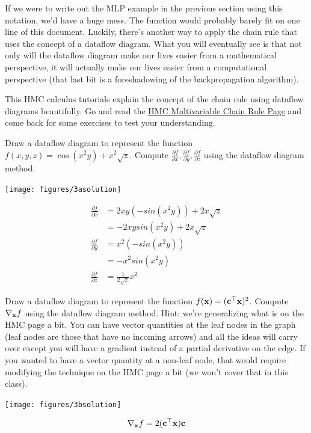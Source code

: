 \documentclass[assignment06_Solutions]{subfiles}
\begin{document}
If we were to write out the MLP example in the previous section using this notation, we'd have a huge mess.  The function would probably barely fit on one line of this document.  Luckily, there's another way to apply the chain rule that uses the concept of a dataflow diagram.  What you will eventually see is that not only will the dataflow diagram make our lives easier from a mathematical perspective, it will actually make our lives easier from a computational perspective (that last bit is a foreshadowing of the backpropagation algorithm).


\begin{externalresources}[(20 minutes)]
This HMC calculus tutorials explain the concept of the chain rule using dataflow diagrams beautifully.  Go and read the \href{https://www.math.hmc.edu/calculus/tutorials/multichainrule/}{HMC Multivariable Chain Rule Page} and come back for some exercises to test your understanding.
\end{externalresources}

\begin{exercise}[(20 minutes)]
\bes
\item Draw a dataflow diagram to represent the function $f(x,y,z) = \cos(x^2 y) + x^2 \sqrt{z}$.  Compute $\frac{\partial f}{\partial x}, \frac{\partial f}{\partial y}, \frac{\partial f}{\partial z}$ using the dataflow diagram method.
\begin{boxedsolution}
\begin{center}
\texttt{[image: figures/3asolution]}
\end{center}
\begin{align}
\frac{\partial f}{\partial x}&= 2x y (-sin(x^2 y)) + 2x{\sqrt z} \nonumber \\
&= -2x y sin(x^2 y) + 2x{\sqrt z} \\
\frac{\partial f}{\partial y} &= x^2 (-sin(x^2 y)) \nonumber \\
&= -x^2 sin(x^2 y) \\
\frac{\partial f}{\partial z} &= \frac{1}{2 \sqrt z} x^2
\end{align}
\end{boxedsolution}
\item Draw a dataflow diagram to represent the function $f(\mathbf{x}) = (\mathbf{c}^\top \mathbf{x})^2$.  Compute $\nabla_{\mathbf{x}} f$ using the dataflow diagram method.  Hint: we're generalizing what is on the HMC page a bit.  You can have vector quantities at the leaf nodes in the graph (leaf nodes are those that have no incoming arrows) and all the ideas will carry over except you will have a gradient instead of a partial derivative on the edge.  If you wanted to have a vector quantity at a non-leaf node, that would require modifying the technique on the HMC page a bit (we won't cover that in this class).
\begin{boxedsolution}
\begin{center}
\texttt{[image: figures/3bsolution]}
\end{center}
\begin{align}
\nabla_{\mathbf{x}} f = 2(\mathbf{c}^\top \mathbf{x}) \mathbf{c}
\end{align}
\end{boxedsolution}
\ees
\end{exercise}
\end{document}
